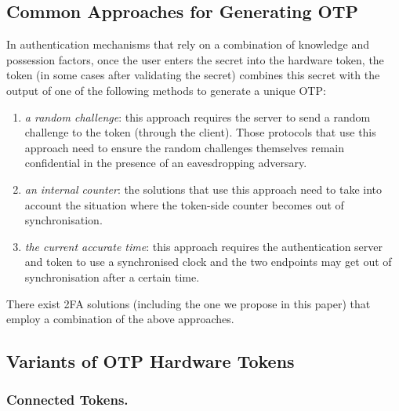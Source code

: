 \subsection{Common Approaches for Generating OTP}

In authentication mechanisms that rely on a combination of knowledge and possession factors, once the user enters the secret into the hardware token, the token (in some cases after validating the secret) combines this secret with the output of one of the following methods to generate a unique OTP: 

\begin{enumerate}

\item \textit{a random challenge}: this approach requires the server to send a random challenge to the token (through the client). Those protocols that use this approach need to ensure the random challenges themselves remain confidential in the presence of an eavesdropping adversary.

\item  \textit{an internal counter}:  the solutions that use this approach need to take into account the situation where the token-side counter becomes out of synchronisation. 


\item \textit{the current accurate time}: this approach requires the authentication server and token to use a synchronised clock and the two endpoints may get out of synchronisation after a certain time. 

\end{enumerate}

There exist 2FA solutions (including the one we propose in this paper) that employ a combination of the above approaches. 
\subsection{Variants of OTP Hardware Tokens}

\subsubsection{Connected Tokens.}


